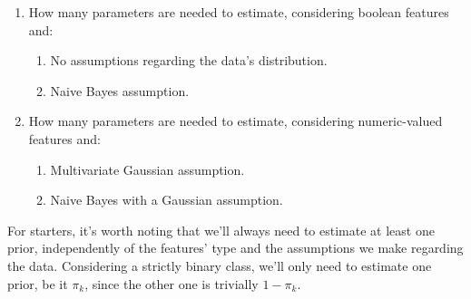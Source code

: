 \documentclass[12pt]{article}
\begin{document}
\begin{enumerate}[leftmargin=\labelsep]
{        \begin{enumerate}
          \item How many parameters are needed to estimate, considering boolean features and:
                \begin{enumerate}
                  \item No assumptions regarding the data's distribution.
                  \item Naive Bayes assumption.
                \end{enumerate}
          \item How many parameters are needed to estimate, considering numeric-valued features and:
                \begin{enumerate}
                  \item Multivariate Gaussian assumption.
                  \item Naive Bayes with a Gaussian assumption.
                \end{enumerate}
        \end{enumerate}
        }

        For starters, it's worth noting that we'll always need to estimate at least
        one prior, independently of the features' type and the assumptions we make
        regarding the data. Considering a strictly binary class, we'll only need
        to estimate one prior, be it $\pi_k$, since the other one is trivially $1 - \pi_k$.


\end{enumerate}
\end{document}
